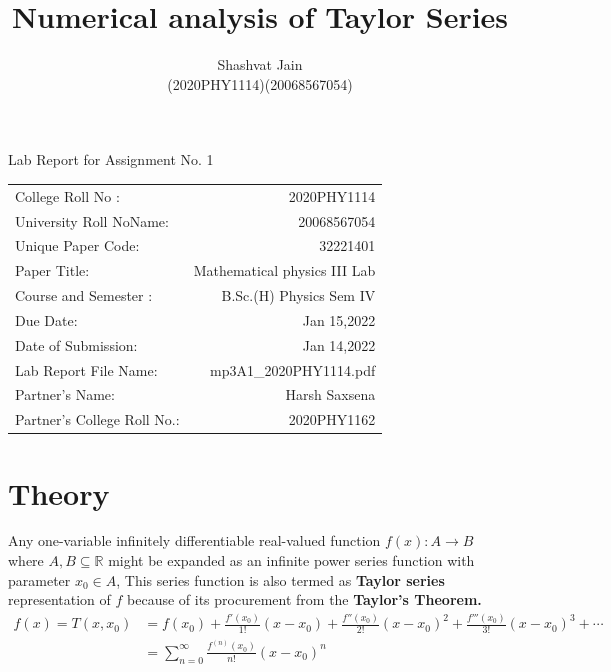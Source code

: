 \documentclass[12pt]{article}
\title{\sffamily Numerical analysis of Taylor Series}
\author{\sffamily Shashvat Jain\\ \sffamily (2020PHY1114)(20068567054)}
\begin{document}

\begin{titlepage}
	\renewcommand\familydefault{\sfdefault}
	\selectfont
	\maketitle
	\vspace{4cm}
	\begin{center}
		\large Lab Report for Assignment No. 1
	\end{center}
	\vspace{4cm}

	\begin{table}[h]
		\centering	
		\begin{tabularx}{0.55\textwidth}{lr}		
			College Roll No :& 2020PHY1114\\
			University Roll NoName:& 20068567054\\
			Unique Paper Code: &32221401\\
			Paper Title: &Mathematical physics III Lab\\
			Course and Semester :&B.Sc.(H) Physics Sem IV\\
			Due Date: & Jan 15,2022\\
			Date of Submission:& Jan 14,2022\\
			Lab Report File Name:& mp3A1\_2020PHY1114.pdf\\
			Partner’s Name:& Harsh Saxsena\\
			Partner’s College  Roll No.:& \sffamily 2020PHY1162\\
		\end{tabularx}
	\end{table}
	
\end{titlepage}
\newpage
\section{Theory}

Any one-variable infinitely differentiable real-valued function $ f(x): A \rightarrow B $ where $A,B \subseteq \mathbb{R}$ might be expanded as an infinite power series function with parameter $ x_0 \in A $, This series function is also termed as \textbf{Taylor series} representation of $ f $ because of its procurement from the \textbf{Taylor's Theorem.}   
\begin{align}
	f(x) = T(x,x_0) &= f(x_0)+{\frac {f'(x_0)}{1!}}(x-x_0)+{\frac {f''(x_0)}{2!}}(x-x_0)^{2}+{\frac {f'''(x_0)}{3!}}(x-x_0)^{3}+\cdots \nonumber\\
	 &= \sum _{n=0}^{\infty }{\frac {f^{(n)}(x_0)}{n!}}(x-x_0)^{n} \qquad \qquad \qquad\qquad\qquad 
\end{align}
\end{document}

